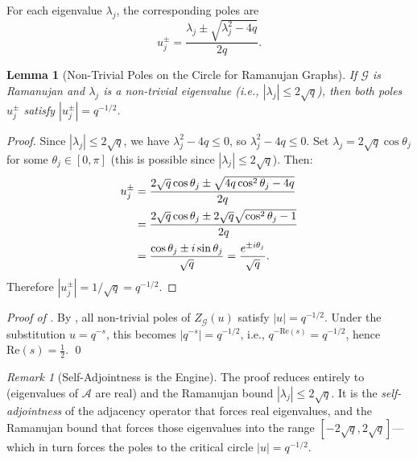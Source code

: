 \documentclass[12pt, a4paper]{article}
\theoremstyle{plain}
\newtheorem{lemma}[theorem]{Lemma}
\theoremstyle{definition}
\theoremstyle{remark}
\newtheorem{remark}[theorem]{Remark}
\newcommand{\abs}[1]{\left| #1 \right|}
\newcommand{\calG}{\mathcal{G}}
\newcommand{\calA}{\mathcal{A}}
\newcommand{\re}{\mathrm{Re}}
\begin{document}
For each eigenvalue $\lambda_j$, the corresponding poles are
\begin{equation}\label{eq:poles}
  u_j^{\pm} = \frac{\lambda_j \pm \sqrt{\lambda_j^2 - 4q}}{2q}.
\end{equation}

\begin{lemma}[Non-Trivial Poles on the Circle for Ramanujan Graphs]\label{lem:poles_circle}
  If $\calG$ is Ramanujan and $\lambda_j$ is a non-trivial eigenvalue (i.e.,
  $\abs{\lambda_j} \leq 2\sqrt{q}$), then both poles $u_j^{\pm}$ satisfy
  $\abs{u_j^{\pm}} = q^{-1/2}$.
\end{lemma}

\begin{proof}
  Since $\abs{\lambda_j} \leq 2\sqrt{q}$, we have $\lambda_j^2 - 4q \leq 0$,
  so $\lambda_j^2 - 4q \leq 0$. Set $\lambda_j = 2\sqrt{q}\cos\theta_j$ for
  some $\theta_j \in [0, \pi]$ (this is possible since $\abs{\lambda_j} \leq
  2\sqrt{q}$). Then:
  \begin{align}
    u_j^{\pm} &= \frac{2\sqrt{q}\cos\theta_j \pm \sqrt{4q\cos^2\theta_j - 4q}}{2q}
    \notag \\
    &= \frac{2\sqrt{q}\cos\theta_j \pm 2\sqrt{q}\sqrt{\cos^2\theta_j - 1}}{2q}
    \notag \\
    &= \frac{\cos\theta_j \pm i\sin\theta_j}{\sqrt{q}}
    = \frac{e^{\pm i\theta_j}}{\sqrt{q}}.
  \end{align}
  Therefore $\abs{u_j^{\pm}} = 1/\sqrt{q} = q^{-1/2}$.
\end{proof}

\begin{proof}[Proof of ]
  By , all non-trivial poles of $Z_\calG(u)$ satisfy
  $\abs{u} = q^{-1/2}$.
  Under the substitution $u = q^{-s}$, this becomes
  $\abs{q^{-s}} = q^{-1/2}$, i.e., $q^{-\re(s)} = q^{-1/2}$,
  hence $\re(s) = \frac{1}{2}$. \qed
\end{proof}

\begin{remark}[Self-Adjointness is the Engine]
  The proof reduces entirely to  (eigenvalues of $\calA$
  are real) and the Ramanujan bound $\abs{\lambda_j} \leq 2\sqrt{q}$. It is
  the \emph{self-adjointness} of the adjacency operator that forces real
  eigenvalues, and the Ramanujan bound that forces those eigenvalues into the
  range $[-2\sqrt{q}, 2\sqrt{q}]$---which in turn forces the poles to the
  critical circle $\abs{u} = q^{-1/2}$.
\end{remark}
\end{document}

